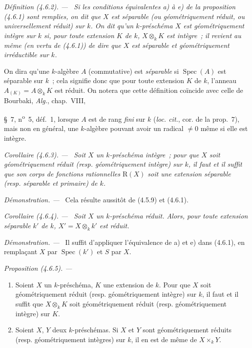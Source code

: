 \documentclass[10pt,oneside]{book}
\newcommand{\oldpage}[2][]{%
  \setcounter{footnote}{0}%
  \marginpar{\scriptsize\textbf{#1}~|~#2}\ignorespaces}
\newenvironment{definition}[1][]{%
  \par\medskip\noindent\itshape Définition (#1). ---\ }{\par}
\newenvironment{proposition}[1][]{%
  \par\medskip\noindent\itshape Proposition (#1). ---\ }{\par}
\newenvironment{corollary}[1][]{%
  \par\medskip\noindent\itshape Corollaire (#1). ---\ }{\par}
\newenvironment{proof}{%
  \par\medskip\noindent\textit{Démonstration. ---\ }}{\par}
\begin{document}
\begin{definition}[4.6.2]
\label{IV.2.4.6.2-fr}
Si les conditions équivalentes a) à e) de la proposition (4.6.1) sont
remplies, on dit que $X$ est \emph{séparable} (ou \emph{géométriquement réduit},
ou \emph{universellement réduit}) sur $k$. On dit qu'un $k$-préschéma $X$ est
\emph{géométriquement intègre} sur $k$ si, pour toute extension $K$ de $k$,
$X\otimes_k K$ est intègre~; il revient au même (en vertu de (4.6.1)) de dire
que $X$ est séparable et géométriquement irréductible sur $k$.
\end{definition}

On dira qu'une $k$-algèbre $A$ (commutative) est \emph{séparable} si
$\operatorname{Spec}(A)$ est séparable sur $k$~; cela signifie donc que pour
toute extension $K$ de $k$, l'anneau $A_{(K)}=A\otimes_k K$ est réduit. On
notera que cette définition coïncide avec celle de Bourbaki, \emph{Alg.},
chap.~VIII,

\oldpage[IV-2]{69}

\S~7, n\textsuperscript{o}~5, déf.~1, lorsque $A$ est de rang \emph{fini} sur
$k$ (\emph{loc. cit.}, cor. de la prop.~7), mais non en général, une $k$-algèbre
pouvant avoir un radical $\neq0$ même si elle est intègre.

\begin{corollary}[4.6.3]
\label{IV.2.4.6.3-fr}
Soit $X$ un $k$-préschéma intègre~; pour que $X$ soit géométriquement réduit
(resp. géométriquement intègre) sur $k$, il faut et il suffit que son corps de
fonctions rationnelles $\mathrm R(X)$ soit une extension séparable (resp.
séparable et primaire) de $k$.
\end{corollary}

\begin{proof}
Cela résulte aussitôt de (4.5.9) et (4.6.1).
\end{proof}

\begin{corollary}[4.6.4]
\label{IV.2.4.6.4-fr}
Soit $X$ un $k$-préschéma réduit. Alors, pour toute extension séparable $k'$ de
$k$, $X'=X\otimes_k k'$ est réduit.
\end{corollary}

\begin{proof}
Il suffit d'appliquer l'équivalence de a) et e) dans (4.6.1), en remplaçant
$X$ par $\operatorname{Spec}(k')$ et $S$ par $X$.
\end{proof}

\begin{proposition}[4.6.5]
\label{IV.2.4.6.5-fr}
\begin{enumerate}
\item[(i)] Soient $X$ un $k$-préschéma, $K$ une extension de $k$. Pour que $X$
soit géométriquement réduit (resp. géométriquement intègre) sur $k$, il faut et
il suffit que $X\otimes_k K$ soit géométriquement réduit (resp. géométriquement
intègre) sur $K$.
\item[(ii)] Soient $X$, $Y$ deux $k$-préschémas. Si $X$ et $Y$ sont
géométriquement réduits (resp. géométriquement intègres) sur $k$, il en est de
même de $X\times_k Y$.
\end{enumerate}
\end{proposition}
\end{document}
